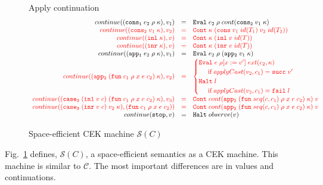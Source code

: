 \documentclass[acmsmall,review,anonymous]{acmart}\settopmatter{printfolios=true,printccs=false,printacmref=false}
\newcommand{\figref}[1]{Fig.~\ref{#1}}
\newcommand{\funrule}[3]{#1 &=& #2 & #3\\}
\newcommand{\hifunrule}[3]{\highlight{#1} &\highlight{=}& \highlight{#2} & 
\highlight{#3}\\}
\newcommand{\sOOinspect}[3]{\mathtt{Eval} \; #1 \; #2 \; #3}
\newcommand{\sOOreturn}[2]{\mathtt{Cont} \; #2 \; #1}
\newcommand{\sOOhalt}[1]{\mathtt{Halt} \; #1}
\newcommand{\rOOsucc}[1]{\mathtt{succ}\;#1}
\newcommand{\rOOfail}[1]{\mathtt{fail}\;#1}
\newcommand{\kOOmt}[0]{\mathtt{stop}}
\newcommand{\kOOconsI}[3]{\mathtt{cons_1} \; #1 \; #2 \; #3}
\newcommand{\kOOconsII}[2]{\mathtt{cons_2} \; #1 \; #2}
\newcommand{\kOOinl}[1]{\mathtt{inl} \; #1}
\newcommand{\kOOinr}[1]{\mathtt{inr} \; #1}
\newcommand{\kOOappI}[3]{
	\mathtt{app_1} \; #1 \; #2 \; #3
}
\newcommand{\kOOappII}[2]{
	\mathtt{app_2} \; #1 \; #2}
\newcommand{\hcvOOfun}[5]{\mathtt{fun} \; #1 \; #2 \; #3 \; #4 \; #5}
\newcommand{\hcvOOcons}[4]{\mathtt{cons}\;#1\;#2\;#3\;#4}
\newcommand{\hcvOOinl}[2]{\mathtt{inl}\;#1\;#2}
\newcommand{\hcvOOinr}[2]{\mathtt{inr}\;#1\;#2}
\newcommand{\hckOOmt}[0]{\mathtt{stop}}
\newcommand{\sidecond}[1]{\text{if}\;#1}
\newcommand{\judgeSreduceTrans}[3]{#2 \longmapsto_{\mathcal{S}(#1)}^{*} #3}
\newcommand{\judgeSeval}[3]{eval_{\mathcal{S}(#1)}(#2) = #3}
\newcommand{\ineffCEK}{$ \mathcal{C} $}
\newcommand{\effCEK}[1]{$ \mathcal{S}(#1) $}
\newcommand{\continue}[2]{continue(#2,#1)}
\newcommand{\highlight}[1]{{\color{red} #1}}
\begin{document}
\begin{figure}
	Apply continuation
	\[
	\begin{array}{rclr}
	

\funrule{
	\continue{v_1}{(\kOOconsI{e_2}{\rho}{\kappa})}}{
	\sOOinspect{e_2}{\rho}{cont(\kOOconsII{v_1}{\kappa})}}{}

\hifunrule{
	\continue{v_2}{(\kOOconsII{v_1}{\kappa})}}{
	\sOOreturn{(\hcvOOcons{v_1}{id(T_1)}{v_2}{id(T_2)})}{\kappa}}{}

\hifunrule{
	\continue{v}{(\kOOinl{\kappa})}}{
	\sOOreturn{(\hcvOOinl{v}{id(T)})}{\kappa}}{}

\hifunrule{
	\continue{v}{(\kOOinr{\kappa})}}{
	\sOOreturn{(\hcvOOinr{v}{id(T)})}{\kappa}}{}

\funrule{
	\continue{v_1}{(\kOOappI{e_2}{\rho}{\kappa})}}{
	\sOOinspect{e_2}{\rho}{(\kOOappII{v_1}{\kappa})}}{}


\hifunrule{
	\continue{v_2}{(\kOOappII{(\hcvOOfun{c_1}{\rho}{x}{e}{c_2})}{\kappa})}}{
\begin{cases}
	\sOOinspect{e}{\rho[x:=v']}{ext(c_2,\kappa)} \\
\;\;\;\;\;\sidecond{applyCast(v_2,c_1) = \rOOsucc{v'}}
\\
\sOOhalt{l} \\
\;\;\;\;\;\sidecond{applyCast(v_2,c_1) = \rOOfail{l}}
\end{cases}
}{}
\hifunrule{
	\continue{v_3}{(\mathtt{case_3}\;(\hcvOOinl{v}{c})\;
		(\hcvOOfun{c_1}{\rho}{x}{e}{c_2})
		\;\kappa)}
}{
	\sOOreturn{v}{cont(\kOOappII{(\hcvOOfun{seq(c,c_1)}{\rho}{x}{e}{c_2})}{\kappa})}
}{}

\hifunrule{
	\continue{(\hcvOOfun{c_1}{\rho}{x}{e}{c_2})}
	{(\mathtt{case_3}\;(\hcvOOinr{v}{c})\;v_2\;\kappa)}
}{
	\sOOreturn{v}{cont(\kOOappII{(\hcvOOfun{seq(c,c_1)}{\rho}{x}{e}{c_2})}{\kappa})}
}{}

\funrule{
	\continue{v}{\kOOmt}}{
	\sOOhalt{observe(v)}}{}
	
	\end{array}\]
	
	
	
	\caption{Space-efficient CEK machine $ \mathcal{S}(C) $}
	\label{fig:machine-cekcc}
\end{figure}
\figref{fig:machine-cekcc} defines, \effCEK{C}, a space-efficient
semantics as a CEK machine.  This machine is similar to \ineffCEK{}.
The most important differences are in values and continuations.
\end{document}
